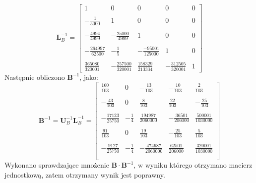 \documentclass[a4paper]{article}
\begin{document}
$$
\textbf{L}_{B}^{-1}=
\left[
\begin{array}
{ccccc}
1&0&0&0&0\\ \\
-\frac{1}{5000}&1&0&0&0 \\ \\
-\frac{4994}{4999}&-\frac{25000}{4999}&1&0&0\\ \\
-\frac{264997}{62500}&-\frac{1}{5}&-\frac{-95001}{125000}&1&0\\ \\
\frac{365080}{320001}&-\frac{257500}{320001}&\frac{158329}{213334}&-\frac{312505}{320001}&1
\end{array}
\right]
$$
Następnie obliczono $\textbf{B}^{-1}$, jako:
$$
\textbf{B}^{-1}=\textbf{U}_{B}^{-1}\textbf{L}_{B}^{-1}=
\left[
\begin{array}
{ccccc}
\frac{160}{103}&0&-\frac{13}{103}&-\frac{10}{103}&\frac{2}{103}\\ \\
-\frac{43}{103}&0&\frac{8}{103}&\frac{22}{103}&-\frac{25}{103}\\ \\
-\frac{17123}{25750}&-\frac{1}{4}&\frac{194987}{2060000}&-\frac{36501}{206000}&\frac{500001}{1030000}\\ \\
\frac{91}{103}&0&\frac{19}{103}&-\frac{25}{103}&\frac{5}{103}\\ \\
-\frac{9127}{25750}&-\frac{1}{4}&-\frac{474987}{2060000}&\frac{62501}{206000}&\frac{320001}{1030000}\\ \\
\end{array}
\right]
$$
Wykonano sprawdzające mnożenie $\textbf{B}\cdot \textbf{B}^{-1}$, w wyniku którego otrzymano macierz jednostkową, zatem otrzymany wynik jest poprawny.
\end{document}
